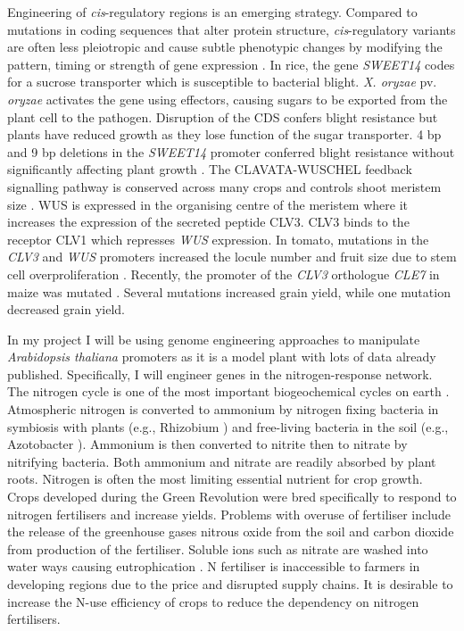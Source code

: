 \documentclass[../main.tex]{subfiles}
\begin{document}
Engineering of \textit{cis}\hyp{}regulatory regions is an emerging strategy.
Compared to mutations in coding sequences that alter protein structure, \textit{cis}\hyp{}regulatory variants are often less pleiotropic and cause subtle phenotypic changes by modifying the pattern, timing or strength of gene expression \autocite{wittkoppCisregulatoryElementsMolecular2012}.
In rice, the gene \textit{SWEET14} codes for a sucrose transporter which is susceptible to bacterial blight.
\textit{X. oryzae} pv. \textit{oryzae} activates the gene using effectors, causing sugars to be exported from the plant cell to the pathogen.
Disruption of the CDS confers blight resistance but plants have reduced growth as they lose function of the sugar transporter.
4 bp and 9 bp deletions in the \textit{SWEET14} promoter conferred blight resistance without significantly affecting plant growth \autocite{liHighefficiencyTALENbasedGene2012}.
The CLAVATA-WUSCHEL feedback signalling pathway is conserved across many crops \autocite{fletcherCLVWUSStemCell2018} and controls shoot meristem size \autocite{somssichCLAVATAWUSCHELSignalingShoot2016}.
WUS is expressed in the organising centre of the meristem where it increases the expression of the secreted peptide CLV3.
CLV3 binds to the receptor CLV1 which represses \textit{WUS} expression.
In tomato, mutations in the \textit{CLV3} and \textit{WUS} promoters increased the locule number and fruit size due to stem cell overproliferation \autocite{rodriguez-lealEngineeringQuantitativeTrait2017}.
Recently, the promoter of the \textit{CLV3} orthologue \textit{CLE7} in maize was mutated \autocite{liuEnhancingGrainyieldrelatedTraits2021}.
Several mutations increased grain yield, while one mutation decreased grain yield.

In my project I will be using genome engineering approaches to manipulate \textit{Arabidopsis thaliana} promoters as it is a model plant with lots of data already published.
Specifically, I will engineer genes in the nitrogen\hyp{}response network.
The nitrogen cycle is one of the most important biogeochemical cycles on earth \autocite{lehnertReversingNitrogenFixation2018}.
Atmospheric nitrogen is converted to ammonium by nitrogen fixing bacteria in symbiosis with plants (e.g., Rhizobium \autocite{molingEvolutionRhizobiumNodulation2015}) and free\hyp{}living bacteria in the soil (e.g., Azotobacter \autocite{bhattacharyyaPlantGrowthpromotingRhizobacteria2012}).
Ammonium is then converted to nitrite then to nitrate by nitrifying bacteria.
Both ammonium and nitrate are readily absorbed by plant roots.
Nitrogen is often the most limiting essential nutrient for crop growth.
Crops developed during the Green Revolution were bred specifically to respond to nitrogen fertilisers and increase yields.
Problems with overuse of fertiliser include the release of the greenhouse gases nitrous oxide from the soil \autocite{zumftCellBiologyMolecular1997} and carbon dioxide from production of the fertiliser.
Soluble ions such as nitrate are washed into water ways causing eutrophication \autocite{gallowayChronologyHumanUnderstanding2013}.
N fertiliser is inaccessible to farmers in developing regions due to the price and disrupted supply chains.
It is desirable to increase the N\hyp{}use efficiency of crops to reduce the dependency on nitrogen fertilisers.
\end{document}
